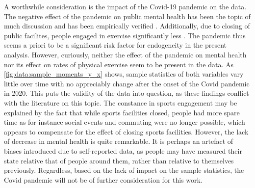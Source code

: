 A worthwhile consideration is the impact of the Covid-19 pandemic on the data. The negative effect of the pandemic on public
mental health has been the topic of much discussion \cite{cullen2020mental,kumar2021covid} and has been empirically verified \cite{kupcova2023effects}.
Additionally, due to closing of public facilites, people engaged in exercise significantly less \cite{amini2021covid}.
The pandemic thus seems a priori to be a significant risk factor for endogeneity in the present analysis.
However, curiously, neither the effect of the pandemic on mental health nor its effect on rates of physical exercise
seem to be present in the data. As \cref{fig:data:sample_moments_y_x} shows, sample statistics of both variables
vary little over time with no appreciably change after the onset of the Covid pandemic in 2020.
This puts the validity of the data into question, as these findings conflict with the literature on this topic.
The constance in sports engagement may be explained by the fact that while sports facilities closed, people had more spare time
as for instance social events and commuting were no longer possible, which appears to compensate for the effect of
closing sports facilities.
However, the lack of decrease in mental health is quite remarkable. It is perhaps an artefact of biases introduced
due to self-reported data, as people may have measured their state relative that of people around them, rather than
relative to themselves previously.
Regardless, based on the lack of impact on the sample statistics, the Covid pandemic will not be of further consideration
for this work.

\begin{figure}[htbp]
    \caption{Distributions of the MHI5-score and sports engagement across years}
    \label{fig:data:sample_moments_y_x}
    \begin{subfigure}[t]{0.49\textwidth}
        \centering
        
        \vspace{0.1em}
    \end{subfigure}
    \hfill
    \begin{subfigure}[t]{0.49\textwidth}
        \centering
        
        \vspace{0.1em}
    \end{subfigure}
\end{figure}

